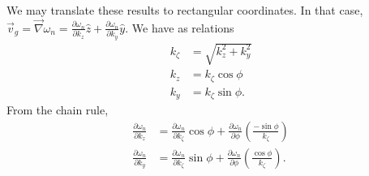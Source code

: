\documentclass{article}
\begin{document}
We may translate these results to rectangular coordinates. In that case, $\vec{v}_{g} = \vec{\nabla} \omega_{n} = \frac{\partial \omega_{n}}{\partial k_{z}} \hat{z} + \frac{\partial \omega_{n}}{\partial k_{y}} \hat{y}$. We have as relations
\begin{align}
k_{\zeta} &= \sqrt{k_{z}^2 + k_{y}^2} \\
k_{z} &= k_{\zeta} \cos{\phi} \\
k_{y} &= k_{\zeta} \sin{\phi}.
\end{align}
From the chain rule,
\begin{align}
\frac{\partial \omega_{n}}{\partial k_{z}} &= \frac{\partial \omega_{n}}{\partial k_{\zeta}} \cos{\phi} + \frac{\partial \omega_{n}}{\partial \phi} \left(\frac{-\sin{\phi}}{k_{\zeta}}\right) \\
\frac{\partial \omega_{n}}{\partial k_{y}} &= \frac{\partial \omega_{n}}{\partial k_{\zeta}} \sin{\phi} + \frac{\partial \omega_{n}}{\partial \phi} \left(\frac{\cos{\phi}}{k_{\zeta}}\right).
\end{align}
\end{document}
